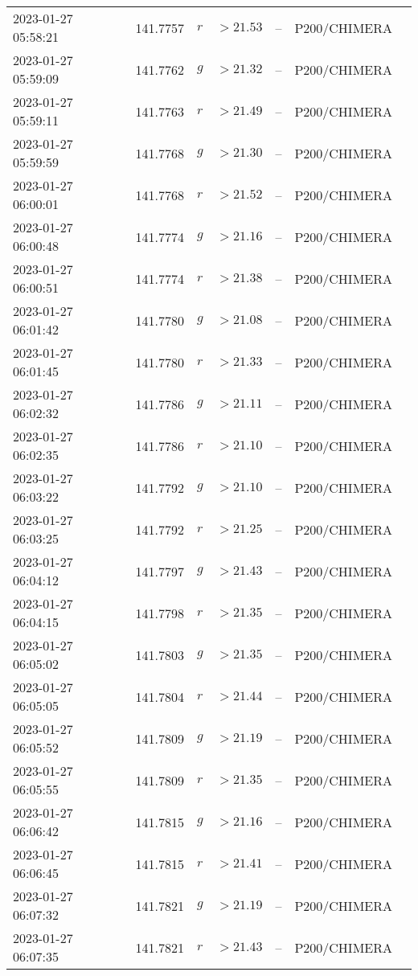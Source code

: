 \documentclass{nature_plusfigure}
\begin{document}
\begin{supplement}
\begin{center}
\begin{longtable}{lllllll}
2023-01-27 05:58:21 & 141.7757 & $r$ & $>21.53$ & -- & P200/CHIMERA &  \\ 
2023-01-27 05:59:09 & 141.7762 & $g$ & $>21.32$ & -- & P200/CHIMERA &  \\ 
2023-01-27 05:59:11 & 141.7763 & $r$ & $>21.49$ & -- & P200/CHIMERA &  \\ 
2023-01-27 05:59:59 & 141.7768 & $g$ & $>21.30$ & -- & P200/CHIMERA &  \\ 
2023-01-27 06:00:01 & 141.7768 & $r$ & $>21.52$ & -- & P200/CHIMERA &  \\ 
2023-01-27 06:00:48 & 141.7774 & $g$ & $>21.16$ & -- & P200/CHIMERA &  \\ 
2023-01-27 06:00:51 & 141.7774 & $r$ & $>21.38$ & -- & P200/CHIMERA &  \\ 
2023-01-27 06:01:42 & 141.7780 & $g$ & $>21.08$ & -- & P200/CHIMERA &  \\ 
2023-01-27 06:01:45 & 141.7780 & $r$ & $>21.33$ & -- & P200/CHIMERA &  \\ 
2023-01-27 06:02:32 & 141.7786 & $g$ & $>21.11$ & -- & P200/CHIMERA &  \\ 
2023-01-27 06:02:35 & 141.7786 & $r$ & $>21.10$ & -- & P200/CHIMERA &  \\ 
2023-01-27 06:03:22 & 141.7792 & $g$ & $>21.10$ & -- & P200/CHIMERA &  \\ 
2023-01-27 06:03:25 & 141.7792 & $r$ & $>21.25$ & -- & P200/CHIMERA &  \\ 
2023-01-27 06:04:12 & 141.7797 & $g$ & $>21.43$ & -- & P200/CHIMERA &  \\ 
2023-01-27 06:04:15 & 141.7798 & $r$ & $>21.35$ & -- & P200/CHIMERA &  \\ 
2023-01-27 06:05:02 & 141.7803 & $g$ & $>21.35$ & -- & P200/CHIMERA &  \\ 
2023-01-27 06:05:05 & 141.7804 & $r$ & $>21.44$ & -- & P200/CHIMERA &  \\ 
2023-01-27 06:05:52 & 141.7809 & $g$ & $>21.19$ & -- & P200/CHIMERA &  \\ 
2023-01-27 06:05:55 & 141.7809 & $r$ & $>21.35$ & -- & P200/CHIMERA &  \\ 
2023-01-27 06:06:42 & 141.7815 & $g$ & $>21.16$ & -- & P200/CHIMERA &  \\ 
2023-01-27 06:06:45 & 141.7815 & $r$ & $>21.41$ & -- & P200/CHIMERA &  \\ 
2023-01-27 06:07:32 & 141.7821 & $g$ & $>21.19$ & -- & P200/CHIMERA &  \\ 
2023-01-27 06:07:35 & 141.7821 & $r$ & $>21.43$ & -- & P200/CHIMERA &  \\ 

\end{longtable}
\end{center}
\end{supplement}
\end{document}
